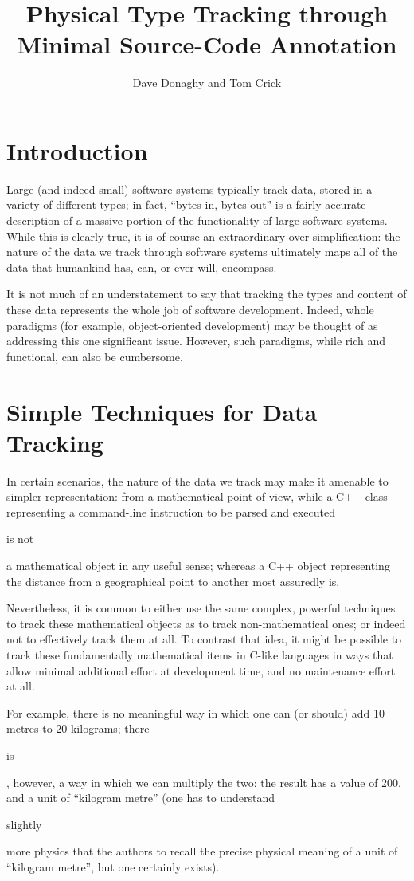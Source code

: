 \documentclass{eceasst}
\title{Physical Type Tracking through Minimal Source-Code Annotation} %
\author{%
Dave Donaghy\autref{1} and
Tom Crick\autref{2}}
\institute{%
\autlabel{1} \email{dave.donaghy@hp.com}\\
HP Bristol, UK\par
\autlabel{2} \email{tcrick@cardiffmet.ac.uk}\\
Department of Computing\\
Cardiff Metropolitan University, UK}
\begin{document}
\maketitle

\section{Introduction}
Large (and indeed small) software systems typically track data, stored
in a variety of different types; in fact, ``bytes in, bytes out'' is a
fairly accurate description of a massive portion of the functionality
of large software systems. While this is clearly true, it is of course
an extraordinary over-simplification: the nature of the data we track
through software systems ultimately maps all of the data that
humankind has, can, or ever will, encompass.

It is not much of an understatement to say that tracking the types and
content of these data represents the whole job of software development.
Indeed, whole paradigms (for example, object-oriented development)
may be thought of as addressing this one significant issue. However,
such paradigms, while rich and functional, can also be cumbersome.

\section{Simple Techniques for Data Tracking}

In certain scenarios, the nature of the data we track may make it amenable
to simpler representation: from a mathematical point of view, while a C++
class representing a command-line instruction to be parsed and executed
\begin{em}is not\end{em} a mathematical object in any useful sense;
whereas a C++ object representing the distance from a geographical point
to another most assuredly is.

Nevertheless, it is common to either use the same complex,
powerful techniques to track these mathematical objects as to track
non-mathematical ones; or indeed not to effectively track them at
all. To contrast that idea, it might be possible to track these fundamentally
mathematical items in C-like languages in ways that allow minimal
additional effort at development time, and no maintenance effort at all.

For example, there is no meaningful way in which one can (or should)
add 10 metres to 20 kilograms; there \begin{em}is\end{em}, however, a
way in which we can multiply the two: the result has a value of 200,
and a unit of ``kilogram metre'' (one has to
understand \begin{em}slightly\end{em} more physics that the authors to
recall the precise physical meaning of a unit of ``kilogram metre'',
but one certainly exists).
\end{document}
